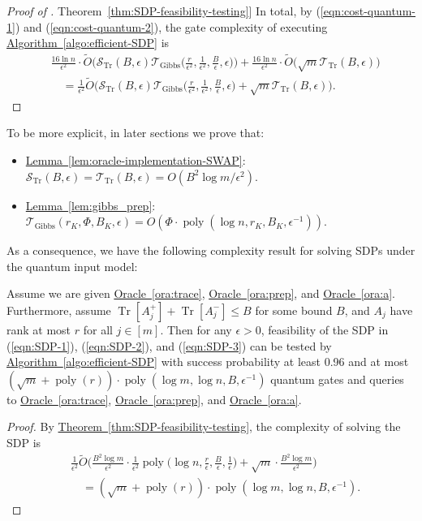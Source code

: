 \documentclass[a4paper,UKenglish,cleveref, autoref]{lipics-v2019}
\theoremstyle{remark}
\numberwithin{equation}{section}
\numberwithin{oracle}{section}
\numberwithin{remark}{section}
\newcommand{\eqn}[1]{(\ref{eqn:#1})}
\newcommand{\ora}[1]{\hyperref[ora:#1]{Oracle~\ref*{ora:#1}}}
\newcommand{\thm}[1]{\hyperref[thm:#1]{Theorem~\ref*{thm:#1}}}
\newcommand{\lem}[1]{\hyperref[lem:#1]{Lemma~\ref*{lem:#1}}}
\newcommand{\algo}[1]{\hyperref[algo:#1]{Algorithm~\ref*{algo:#1}}}
\newcommand{\range}[1]{[#1]}
\DeclareMathOperator{\poly}{poly}
\DeclareMathOperator{\tr}{Tr}
\DeclareMathOperator{\Tr}{Tr}
\begin{document}
\begin{proof}[Proof of \thm{SDP-feasibility-testing}]
In total, by \eqn{cost-quantum-1} and \eqn{cost-quantum-2}, the gate complexity of executing \algo{efficient-SDP} is
\begin{align}
&\frac{16\ln n}{\epsilon^{2}}\cdot\tilde{O}\Big(\mathcal{S}_{\tr}(B,\epsilon)\mathcal{T}_{\text{Gibbs}}\Big(\frac{r}{\epsilon^{2}},\frac{1}{\epsilon^{2}},\frac{B}{\epsilon},\epsilon\Big)\Big)+\frac{16\ln n}{\epsilon^{2}}\cdot\tilde{O}\big(\sqrt{m}\mathcal{T}_{\tr}(B,\epsilon)\big) \nonumber \\
&\quad=\frac{1}{\epsilon^{2}}\tilde{O}\Big(\mathcal{S}_{\tr}(B,\epsilon)\mathcal{T}_{\text{Gibbs}}\Big(\frac{r}{\epsilon^{2}},\frac{1}{\epsilon^{2}},\frac{B}{\epsilon},\epsilon\Big)+\sqrt{m}\mathcal{T}_{\tr}(B,\epsilon)\Big).
\end{align}
\end{proof}

To be more explicit, in later sections we prove that:
\begin{itemize}
\item \lem{oracle-implementation-SWAP}: $\mathcal{S}_{\tr}(B,\epsilon)=\mathcal{T}_{\tr}(B,\epsilon)=O(B^{2}\log m/\epsilon^{2})$.
\item \lem{gibbs_prep}: $\mathcal{T}_{\text{Gibbs}}(r_{K},\Phi,B_{K},\epsilon)=O(\Phi\cdot\poly(\log n, r_{K}, B_{K}, \epsilon^{-1}))$.
\end{itemize}

As a consequence, we have the following complexity result for solving SDPs under the quantum input model:

\begin{corollary}\label{cor:SDP-feasibility-testing-quantum}
Assume we are given \ora{trace}, \ora{prep}, and \ora{a}. Furthermore, assume $\Tr[A_{j}^{+}]+\Tr[A_{j}^{-}]\leq B$ for some bound $B$, and $A_{j}$ have rank at most $r$ for all $j\in\range{m}$. Then for any $\epsilon>0$, feasibility of the SDP in \eqn{SDP-1}, \eqn{SDP-2}, and \eqn{SDP-3} can be tested by \algo{efficient-SDP} with success probability at least 0.96 and at most $(\sqrt{m}+\poly(r))\cdot\poly(\log m,\log n,B,\epsilon^{-1})$ quantum gates and queries to \ora{trace}, \ora{prep}, and \ora{a}.
\end{corollary}

\begin{proof}
By \thm{SDP-feasibility-testing}, the complexity of solving the SDP is
\begin{align}\label{eqn:SDP-feasibility-testing-result}
&\frac{1}{\epsilon^{2}}\tilde{O}\Big(\frac{B^{2}\log m}{\epsilon^{2}}\cdot\frac{1}{\epsilon^{2}}\poly\Big(\log n,\frac{r}{\epsilon},\frac{B}{\epsilon},\frac{1}{\epsilon}\Big)+\sqrt{m}\cdot\frac{B^{2}\log m}{\epsilon^{2}}\Big) \nonumber \\
&\quad=(\sqrt{m}+\poly(r))\cdot\poly(\log m,\log n,B,\epsilon^{-1}).
\end{align}
\end{proof}
\end{document}
